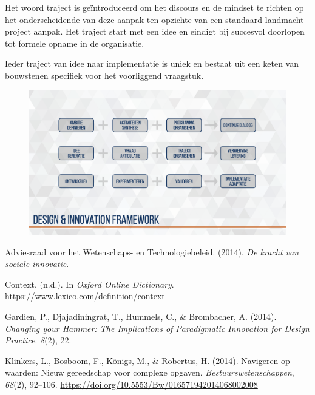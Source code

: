 \documentclass[
]{book}
\newlength{\cslhangindent}
\newenvironment{CSLReferences}[2] %
 {%
  \setlength{\parindent}{0pt}
  \ifodd #1 \everypar{\setlength{\hangindent}{\cslhangindent}}\ignorespaces\fi
  \ifnum #2 > 0
  \setlength{\parskip}{#2\baselineskip}
  \fi
 }%
 {}
\begin{document}
Het woord traject is geïntroduceerd om het discours en de mindset te richten op het onderscheidende van deze aanpak ten opzichte van een standaard landmacht project aanpak. Het traject start met een idee en eindigt bij succesvol doorlopen tot formele opname in de organisatie.

Ieder traject van idee naar implementatie is uniek en bestaat uit een keten van bouwstenen specifiek voor het voorliggend vraagstuk.

\begin{figure}
\includegraphics[width=26.67in]{data/keynote-slides/20200430-CDE-Designprocess/20200430-CDE-Designprocess.027} \caption{ }\label{fig:unnamed-chunk-35}
\end{figure}

\hypertarget{refs}{}
\begin{CSLReferences}{1}{0}
\leavevmode{}%
Adviesraad voor het Wetenschaps- en Technologiebeleid. (2014). \emph{De kracht van sociale innovatie}.

\leavevmode{}%
Context. (n.d.). In \emph{Oxford Online Dictionary}. \url{https://www.lexico.com/definition/context}

\leavevmode{}%
Gardien, P., Djajadiningrat, T., Hummels, C., \& Brombacher, A. (2014). \emph{Changing your {Hammer}: {The} {Implications} of {Paradigmatic} {Innovation} for {Design} {Practice}}. \emph{8}(2), 22.

\leavevmode{}%
Klinkers, L., Bosboom, F., Königs, M., \& Robertus, H. (2014). Navigeren op waarden: Nieuw gereedschap voor complexe opgaven. \emph{Bestuurswetenschappen}, \emph{68}(2), 92--106. \url{https://doi.org/10.5553/Bw/016571942014068002008}

\end{CSLReferences}
\end{document}
